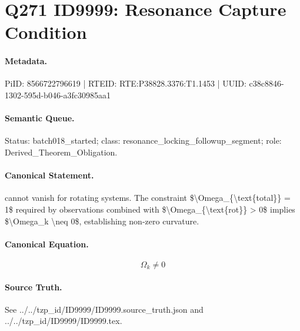 \section*{Q271 ID9999: Resonance Capture Condition}
\paragraph{Metadata.}
PiID: 8566722796619 | RTEID: RTE:P38828.3376:T1.1453 | UUID: c38c8846-1302-595d-b046-a3fc30985aa1

\paragraph{Semantic Queue.}
Status: batch018\_started; class: resonance\_locking\_followup\_segment; role: Derived\_Theorem\_Obligation.

\paragraph{Canonical Statement.}
cannot vanish for rotating systems. The constraint \$\textbackslash{}Omega\_\{\textbackslash{}text\{total\}\} = 1\$ required by observations combined with \$\textbackslash{}Omega\_\{\textbackslash{}text\{rot\}\} > 0\$ implies \$\textbackslash{}Omega\_k \textbackslash{}neq 0\$, establishing non-zero curvature.

\paragraph{Canonical Equation.}
\[
\Omega_k \neq 0
\]

\paragraph{Source Truth.}
See ../../tzp\_id/ID9999/ID9999.source\_truth.json and ../../tzp\_id/ID9999/ID9999.tex.
